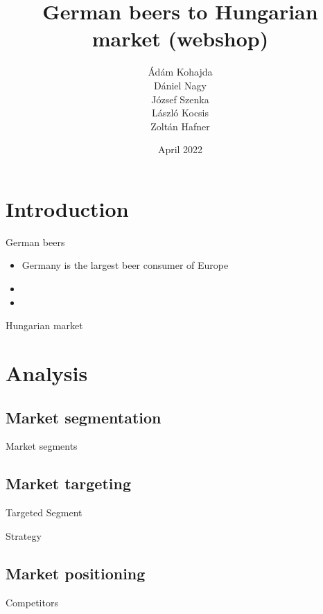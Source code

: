 \documentclass[aspectratio=169]{beamer}
\title[Group Assignment] %
{German beers to Hungarian market (webshop)}
\subtitle{}
\author[]
{Ádám Kohajda \\ Dániel Nagy \\ József Szenka \\ László Kocsis \\ Zoltán Hafner}
\date[April 2022] %
{April 2022}
\begin{document}
\begin{frame}[plain]
    \titlepage
\end{frame}


\section{Introduction}

\begin{frame}{German beers}
\begin{itemize}
   \item Germany is the largest beer consumer of Europe
   \item
   \item
\end{itemize}
\end{frame}

\begin{frame}{Hungarian market}

\end{frame}


\section{Analysis}

\subsection{Market segmentation}
\begin{frame}{Market segments}

\end{frame}



\subsection{Market targeting}
\begin{frame}{Targeted Segment}

\end{frame}

\begin{frame}{Strategy}

\end{frame}



\subsection{Market positioning}
\begin{frame}{Competitors}

\end{frame}
\end{document}
